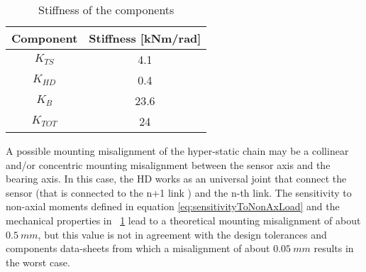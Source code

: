 %
\DIFdelbegin %
{%
}
\DIFdelend %
%
\begin{table}[]
	\renewcommand{\arraystretch}{1.3}
	\caption{Stiffness of the components}
	\label{tab:nonAxialStiffness}
	\centering
	\begin{tabular}{c c}
		\hline \hline
		\bfseries Component & \bfseries Stiffness [kNm/rad]\\
		\hline
		$K_{TS}$  & 4.1\\
		$K_{HD}$  & 0.4\\
		$K_{B}$   & 23.6\\
		\hline
		$K_{TOT}$   & 24\\
		\hline \hline
	\end{tabular}
\end{table}
%
%
\par A possible mounting misalignment of the hyper-static chain may be a collinear and/or concentric mounting misalignment between the sensor axis and the bearing axis. In this case, the HD works as an universal joint that connect the sensor (that is connected to the \DIFdelbegin \DIFdel{(}\DIFdelend n+1 \DIFdelbegin {}\DIFdelend link ) and the n-th link. The sensitivity to non-axial moments defined in equation \eqref{eq:sensitivityToNonAxLoad} and  the mechanical properties  in \tablename \ \ref{tab:nonAxialStiffness} lead to a theoretical mounting misalignment of about $0.5 \ mm$, but this value is not in agreement with the design tolerances and components data-sheets from which a misalignment of about $0.05 \ mm$ results in the worst case.
%
